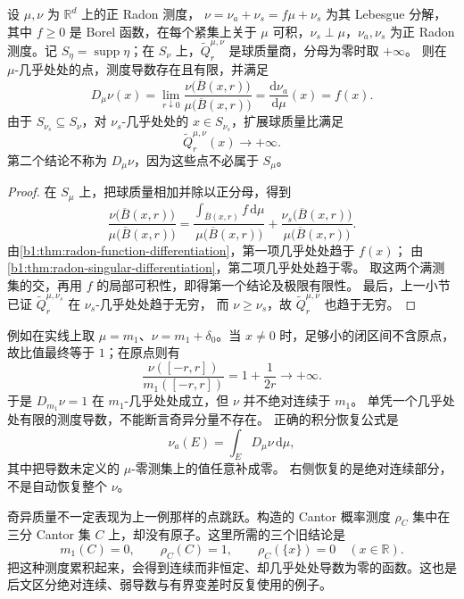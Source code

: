 \begin{theorem}\label{b1:thm:radon-measure-differentiation}
设 \(\mu,\nu\) 为 \(\mathbb R^d\) 上的正 Radon 测度，
\(\nu=\nu_a+\nu_s=f\mu+\nu_s\) 为其 Lebesgue 分解，其中 \(f\ge0\) 是 Borel 函数，在每个紧集上关于 \(\mu\) 可积，\(\nu_s\perp\mu\)，\(\nu_a,\nu_s\) 为正 Radon 测度。记 \(S_\eta=\operatorname{supp}\eta\)；在 \(S_\nu\) 上，\(\widetilde Q_r^{\mu,\nu}\) 是球质量商，分母为零时取 \(+\infty\)。
则在 \(\mu\)-几乎处处的点，测度导数存在且有限，并满足
\[
 D_\mu\nu(x)
 =\lim_{r\downarrow0}
  \frac{\nu\bigl(\overline B(x,r)\bigr)}
       {\mu\bigl(\overline B(x,r)\bigr)}
 =\frac{\mathrm d\nu_a}{\mathrm d\mu}(x)=f(x).
\]
由于 \(S_{\nu_s}\subseteq S_\nu\)，对 \(\nu_s\)-几乎处处的 \(x\in S_{\nu_s}\)，扩展球质量比满足
\[
 \widetilde Q_r^{\mu,\nu}(x)\longrightarrow+\infty.
\]
第二个结论不称为 \(D_\mu\nu\)，因为这些点不必属于 \(S_\mu\)。
\end{theorem}
\begin{proof}
在 \(S_\mu\) 上，把球质量相加并除以正分母，得到
\[
 \frac{\nu\bigl(\overline B(x,r)\bigr)}
      {\mu\bigl(\overline B(x,r)\bigr)}
 =\frac{\int_{\overline B(x,r)}f\,\mathrm d\mu}
       {\mu\bigl(\overline B(x,r)\bigr)}
 +\frac{\nu_s\bigl(\overline B(x,r)\bigr)}
       {\mu\bigl(\overline B(x,r)\bigr)}.
\]
由\cref{b1:thm:radon-function-differentiation}，第一项几乎处处趋于 \(f(x)\)；
由\cref{b1:thm:radon-singular-differentiation}，第二项几乎处处趋于零。
取这两个满测集的交，再用 \(f\) 的局部可积性，即得第一个结论及极限有限性。
最后，上一小节已证 \(\widetilde Q_r^{\mu,\nu_s}\) 在 \(\nu_s\)-几乎处处趋于无穷，
而 \(\nu\geq\nu_s\)，故 \(\widetilde Q_r^{\mu,\nu}\) 也趋于无穷。
\end{proof}

例如在实线上取 \(\mu=m_1\)、\(\nu=m_1+\delta_0\)。当 \(x\ne0\) 时，足够小的闭区间不含原点，
故比值最终等于 \(1\)；在原点则有
\[
 \frac{\nu([-r,r])}{m_1([-r,r])}=1+\frac1{2r}\longrightarrow+\infty.
\]
于是 \(D_{m_1}\nu=1\) 在 \(m_1\)-几乎处处成立，但 \(\nu\) 并不绝对连续于 \(m_1\)。
单凭一个几乎处处有限的测度导数，不能断言奇异分量不存在。
正确的积分恢复公式是
\[
 \nu_a(E)=\int_E D_\mu\nu\,\mathrm d\mu,
\]
其中把导数未定义的 \(\mu\)-零测集上的值任意补成零。
右侧恢复的是绝对连续部分，不是自动恢复整个 \(\nu\)。

奇异质量不一定表现为上一例那样的点跳跃。构造的 Cantor 概率测度 \(\rho_C\) 集中在三分 Cantor 集 \(C\) 上，却没有原子。这里所需的三个旧结论是
\[
 m_1(C)=0,\qquad \rho_C(C)=1,\qquad \rho_C(\{x\})=0\quad(x\in\mathbb R).
\]
把这种测度累积起来，会得到连续而非恒定、却几乎处处导数为零的函数。这也是后文区分绝对连续、弱导数与有界变差时反复使用的例子。

